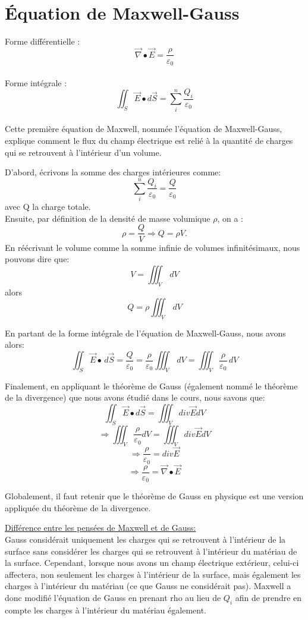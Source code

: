 \documentclass[12pt]{article}
\begin{document}
\newpage\section*{Équation de Maxwell-Gauss}

Forme différentielle : $$\vec{\nabla} \bullet \vec{E} = \frac{\rho}{\varepsilon_0}$$\\

Forme intégrale : $$\iint_S \vec{E} \bullet d\vec{S} = \sum_i^n \frac{Q_i}{\varepsilon_0}$$\\

\noindent Cette première équation de Maxwell, nommée l'équation de Maxwell-Gauss, explique comment le flux du champ électrique est relié à la quantité de charges qui se retrouvent à l'intérieur d'un volume.

\noindent D'abord, écrivons la somme des charges intérieures comme: $$ \sum_i^n \frac{Q_i}{\varepsilon_0} = \frac{Q}{\varepsilon_0} $$ avec Q la charge totale.\\

\noindent Ensuite, par définition de la densité de masse volumique $\rho$, on a : $$\rho = \frac{Q}{V} \Rightarrow Q = \rho V.$$
\noindent En réécrivant le volume comme la somme infinie de volumes infinitésimaux, nous pouvons dire que:
$$V = \iiint_V \,dV$$ alors $$Q = \rho \iiint_V \,dV$$

\noindent En partant de la forme intégrale de l'équation de Maxwell-Gauss, nous avons alors: $$\iint_S \Vec{E} \bullet \,d\Vec{S} = \frac{Q}{\varepsilon_0} = \frac{\rho}{\varepsilon_0} \iiint_V \,dV = \iiint_V \frac{\rho}{\varepsilon_0} \,dV$$

\noindent Finalement, en appliquant le théorème de Gauss (également nommé le théorème de la divergence) que nous avons étudié dans le cours, nous savons que: 
 \[\iint_S{\vec{E}\bullet d\vec{S}}=\iiint_V{div\vec{E}dV}\]
\[\Rightarrow\iiint_V{\frac{\rho}{\varepsilon_0}dV=\iiint_V{div\vec{E}dV}}\]
\[\Rightarrow\frac{\rho}{\varepsilon_0}=div\vec{E}\]
\[\Rightarrow\frac{\rho}{\varepsilon_0}=\vec{\nabla}\bullet\vec{E}\]

\noindent Globalement, il faut retenir que le théorème de Gauss en physique est une version appliquée du théorème de la divergence.

\noindent \underline{Différence entre les pensées de Maxwell et de Gauss:} \\Gauss considérait uniquement les charges qui se retrouvent à l'intérieur de la surface sans considérer les charges qui se retrouvent à l'intérieur du matériau de la surface. Cependant, lorsque nous avons un champ électrique extérieur, celui-ci affectera, non seulement les charges à l'intérieur de la surface, mais également les charges à l'intérieur du matériau (ce que Gauss ne considérait pas). Maxwell a donc modifié l'équation de Gauss en prenant rho au lieu de $Q_i$ afin de prendre en compte les charges à l'intérieur du matériau également.
\end{document}
